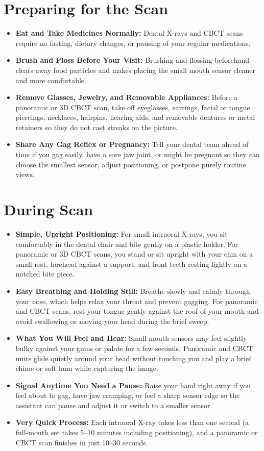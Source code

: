 \section{Preparing for the Scan}
\begin{itemize}
\item \textbf{Eat and Take Medicines Normally:} Dental X-rays and CBCT scans require no fasting, dietary changes, or pausing of your regular medications.
\item \textbf{Brush and Floss Before Your Visit:} Brushing and flossing beforehand clears away food particles and makes placing the small mouth sensor cleaner and more comfortable.
\item \textbf{Remove Glasses, Jewelry, and Removable Appliances:} Before a panoramic or 3D CBCT scan, take off eyeglasses, earrings, facial or tongue piercings, necklaces, hairpins, hearing aids, and removable dentures or metal retainers so they do not cast streaks on the picture.
\item \textbf{Share Any Gag Reflex or Pregnancy:} Tell your dental team ahead of time if you gag easily, have a sore jaw joint, or might be pregnant so they can choose the smallest sensor, adjust positioning, or postpone purely routine views.
\end{itemize}

\section{During Scan}
\begin{itemize}
\item \textbf{Simple, Upright Positioning:} For small intraoral X-rays, you sit comfortably in the dental chair and bite gently on a plastic holder. For panoramic or 3D CBCT scans, you stand or sit upright with your chin on a small rest, forehead against a support, and front teeth resting lightly on a notched bite piece.
\item \textbf{Easy Breathing and Holding Still:} Breathe slowly and calmly through your nose, which helps relax your throat and prevent gagging. For panoramic and CBCT scans, rest your tongue gently against the roof of your mouth and avoid swallowing or moving your head during the brief sweep.
\item \textbf{What You Will Feel and Hear:} Small mouth sensors may feel slightly bulky against your gums or palate for a few seconds. Panoramic and CBCT units glide quietly around your head without touching you and play a brief chime or soft hum while capturing the image.
\item \textbf{Signal Anytime You Need a Pause:} Raise your hand right away if you feel about to gag, have jaw cramping, or feel a sharp sensor edge so the assistant can pause and adjust it or switch to a smaller sensor.
\item \textbf{Very Quick Process:} Each intraoral X-ray takes less than one second (a full-mouth set takes 5--10 minutes including positioning), and a panoramic or CBCT scan finishes in just 10--30 seconds.
\end{itemize}

